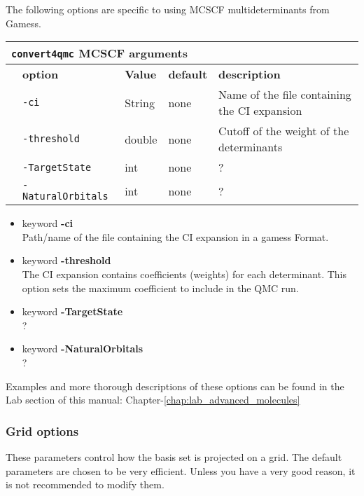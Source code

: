 The following options are specific to using MCSCF multideterminants from Gamess. 

 \begin{table}[h]
 \begin{center}
 \begin{tabularx}{\textwidth}{l l l l l }
 \hline
 \multicolumn{5}{l}{\texttt{convert4qmc} MCSCF arguments} \\
 \hline
    &   \bfseries option      & \bfseries Value & \bfseries default   & \bfseries description \\
    &   \texttt{-ci    } & String     &   none & Name of the file containing the CI expansion  \\
    &   \texttt{-threshold         } &  double    &  none & Cutoff of the weight of the determinants  \\
    &   \texttt{-TargetState      } & int  &  none & ?  \\
    &   \texttt{-NaturalOrbitals      } &  int      &  none   & ?  \\
    \hline
     \end{tabularx}
 \end{center}
 \end{table}
\begin{itemize}
\item keyword \textbf{-ci}\\
Path/name of the file containing the CI expansion in a gamess Format.
\item keyword \textbf{-threshold}\\
The CI expansion contains coefficients (weights) for each determinant. This option sets the maximum coefficient to include in the QMC run. 
\item keyword \textbf{-TargetState}\\
?
\item keyword \textbf{-NaturalOrbitals}\\
?
\end{itemize}

Examples and more thorough descriptions of these options can be found in the Lab section of this manual: Chapter-\ref{chap:lab_advanced_molecules}\\

\subsubsection{Grid options}
                                          
% 
These parameters control how the basis set is projected on a grid. The default parameters are chosen to be very efficient. Unless you have a very good reason, it is not recommended to modify them. 


